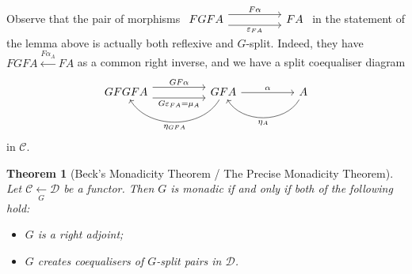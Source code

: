 \documentclass[a4paper,11pt]{article}
\theoremstyle{break_italics}
\newtheorem*{theorem*}{Theorem}
\theoremstyle{break_upright}
\theoremstyle{remark}
\newcommand{\C}{\mathcal{C}}
\newcommand{\D}{\mathcal{D}}
\begin{document}
Observe that the pair of morphisms $\begin{tikzcd}
FGFA \arrow[rr, "F\alpha", shift left=2] \arrow[rr, "\varepsilon_{FA}"', shift right=2] &  & FA
\end{tikzcd}$ in the statement of the lemma above is actually both reflexive and $G$-split. Indeed, they have $FGFA \xleftarrow{F\alpha_A} FA$ as a common right inverse, and we have a split coequaliser diagram
\[
\begin{tikzcd}
GFGFA \arrow[rr, "GF\alpha", shift left=2] \arrow[rr, "G\varepsilon_{FA} = \mu_A"', shift right=2] &  & GFA \arrow[rr, "\alpha"] \arrow[ll, "\eta_{GFA}", bend left=60] &  & A \arrow[ll, "\eta_A", bend left=60]
\end{tikzcd}
\]
in $\C$.


\begin{theorem*}[Beck's Monadicity Theorem / The Precise Monadicity Theorem]
	Let $\C \xleftarrow[G]{} \D$ be a functor. Then $G$ is monadic if and only if both of the following hold:
	\begin{itemize}
		\item $G$ is a right adjoint;
		\item $G$ creates coequalisers of $G$-split pairs in $\D$.
	\end{itemize}
\end{theorem*}
\end{document}
